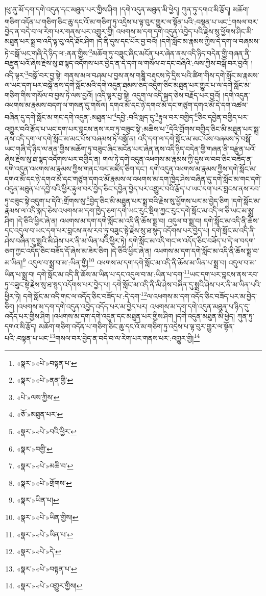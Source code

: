 །ཕུ་ནུ་མོ་དག་དགེ་འདུན་དང་མཐུན་པར་གྱིས་ཤིག །དགེ་འདུན་མཐུན་མི་ཕྱེད། ཀུན་ཏུ་དགའ་མི་རྩོད། མཆོག་གཅིག་འདོན་པ་གཅིག་ཅིང་ཆུ་དང་འོ་མ་གཅིག་ཏུ་འདྲེས་པ་ལྟ་བུར་གྱུར་ལ་སྟོན་པའི་:བསྟན་པ་ཡང་\footnote{«སྣར་»«པེ་»བསྟན་པ་}གསལ་བར་བྱེད་ན་བདེ་བ་ལ་རེག་པར་གནས་པར་འགྱུར་གྱི། འཕགས་མ་དག་དགེ་འདུན་འབྱེད་པའི་རྗེས་སུ་ཕྱོགས་ཤིང་མི་མཐུན་པར་སྨྲ་བ་འདི་ལྟ་བུ་འདི་ཐོང་ཤིག །དེ་ནི་དུས་དང་པོར་བྱ་བའོ། །དགེ་སློང་མ་རྣམས་ཀྱིས་དེ་དག་ལ་བཞམས་ཏེ་བསྒོ་ཡང་གཞི་དེ་ཉིད་ལ་:ནན་གྱིས་\footnote{«སྣར་»«པེ་»ནན་གྱི་}མཆོག་ཏུ་བཟུང་ཞིང་མངོན་པར་ཞེན་ནས་འདི་ཉིད་བདེན་གྱི་གཞན་ནི་བརྫུན་པའོ་ཞེས་རྗེས་སུ་ཐ་སྙད་འདོགས་པར་བྱེད་ན་དེ་དག་ལ་གསོལ་བ་དང་བཞིའི་:ལས་ཀྱིས་བསྒོ་བར་བྱའོ། །འདི་ལྟར་\footnote{«པེ་»ལས་ཀྱིས་}བསྒོ་བར་བྱ་སྟེ། གནས་མལ་བཤམ་པ་བྱས་ནས་གཎྜཱི་བརྡུངས་ཏེ་དྲིས་པའི་ཚིག་གིས་དགེ་སློང་མ་རྣམས་ལ་ཡང་དག་པར་བསྒོ་ནས་དགེ་སློང་མའི་དགེ་འདུན་ཐམས་ཅད་འདུག་ཅིང་མཐུན་པར་གྱུར་པ་ལ་དགེ་སློང་མ་གཅིག་གིས་གསོལ་བ་བྱས་ཏེ་ལས་བྱའོ། །འདི་ལྟར་བྱ་སྟེ། འདུག་ལ་འདི་སྐད་ཅེས་བརྗོད་པར་བྱའོ། །དགེ་འདུན་འཕགས་མ་རྣམས་བདག་ལ་གསན་དུ་གསོལ། དགའ་མོ་དང་ཉེ་དགའ་མོ་དང་གཙུག་དགའ་མོ་དེ་དག་འཚལ་བཞིན་དུ་དགེ་སློང་མ་གང་དགེ་འདུན་:མཐུན་པ་\footnote{«ཅོ་»མཐུན་པར་}དབྱེ་:བའི་སླད་དུ་\footnote{«སྣར་»«པེ་»བའི་ཕྱིར་}རྟུལ་བར་བགྱིད་\footnote{«སྣར་»བགྱི་}ཅིང་དབྱེན་བགྱིད་པར་འགྱུར་བའི་རྩོད་པ་ཡང་དག་པར་བླངས་ནས་རབ་ཏུ་བཟུང་སྟེ་:མཆིས་པ་\footnote{«སྣར་»«པེ་»མཆི་བ་}དེའི་གྲོགས་བགྱིད་ཅིང་མི་མཐུན་པར་སྨྲ་ནས་འདི་དག་ལ་དགེ་སློང་མ་མང་པོས་བཞམས་ཏེ་བསྒོ་ན། འདི་དག་ལ་དགེ་སློང་མ་མང་པོས་བཞམས་ཏེ་བསྒོ་ཡང་གཞི་དེ་ཉིད་ལ་ནན་གྱིས་མཆོག་ཏུ་བཟུང་ཞིང་མངོན་པར་ཞེན་ནས་འདི་ཉིད་བདེན་གྱི་གཞན་ནི་བརྫུན་པའོ་ཞེས་རྗེས་སུ་ཐ་སྙད་འདོགས་པར་བགྱིད་ན། གལ་ཏེ་དགེ་འདུན་འཕགས་མ་རྣམས་ཀྱི་དུས་ལ་བབ་ཅིང་བཟོད་ན་དགེ་འདུན་འཕགས་མ་རྣམས་ཀྱིས་གནང་བར་མཛོད་ཅིག་དང་། དགེ་འདུན་འཕགས་མ་རྣམས་ཀྱིས་དགེ་སློང་མ་དགའ་མོ་དང་ཉེ་དགའ་མོ་དང་གཙུག་དགའ་མོ་རྣམས་ལ་འཕགས་མ་དག་ཁྱེད་ཤེས་བཞིན་དུ་དགེ་སློང་མ་གང་དགེ་འདུན་མཐུན་པ་དབྱེ་བའི་ཕྱིར་རྟུལ་བར་བྱེད་ཅིང་དབྱེན་བྱེད་པར་འགྱུར་བའི་རྩོད་པ་ཡང་དག་པར་བླངས་ནས་རབ་ཏུ་བཟུང་སྟེ་འདུག་པ་དེའི་:གྲོགས་སུ་\footnote{«སྣར་»«པེ་»གྲོགས་}བྱེད་ཅིང་མི་མཐུན་པར་སྨྲ་བའི་རྗེས་སུ་ཕྱོགས་པར་མ་བྱེད་ཅིག །དགེ་སློང་མ་རྣམས་ལ་འདི་སྐད་ཅེས་འཕགས་མ་དག་ཁྱེད་ཅག་དགེ་ཡང་རུང་སྡིག་ཀྱང་རུང་དགེ་སློང་མ་འདི་ལ་ཅི་ཡང་མ་སྨྲ་ཤིག །དེ་ཅིའི་ཕྱིར་ཞེ་ན། འཕགས་མ་དག་དགེ་སློང་མ་འདི་ནི་ཆོས་སྨྲ་བ། འདུལ་བ་སྨྲ་བ། དགེ་སློང་མ་འདི་ནི་ཆོས་དང་འདུལ་བ་ཡང་དག་པར་བླངས་ནས་རབ་ཏུ་བཟུང་སྟེ་རྗེས་སུ་ཐ་སྙད་འདོགས་པར་བྱེད་པ། དགེ་སློང་མ་འདི་ནི་ཤེས་བཞིན་དུ་སྨྲའི་མི་ཤེས་པར་ནི་མ་ཡིན་པའི་ཕྱིར་ཏེ། དགེ་སློང་མ་འདི་གང་ལ་འདོད་ཅིང་བཟོད་པ་དེ་ལ་བདག་ཅག་ཀྱང་འདོད་ཅིང་བཟོད་དོ་ཞེས་མ་ཟེར་ཅིག །དེ་ཅིའི་ཕྱིར་ཞེ་ན། འཕགས་མ་དག་དགེ་སློང་མ་འདི་ནི་ཆོས་སྨྲ་བ་མ་ཡིན།\footnote{«སྣར་»ཡིན་པ།} འདུལ་བ་སྨྲ་བ་མ་:ཡིན་གྱི།\footnote{«སྣར་»«པེ་»ཡིན་གྱིས།} འཕགས་མ་དག་དགེ་སློང་མ་འདི་ནི་ཆོས་མ་ཡིན་པ་སྨྲ་བ། འདུལ་བ་མ་ཡིན་པ་སྨྲ་བ། དགེ་སློང་མ་འདི་ནི་ཆོས་མ་ཡིན་པ་དང་འདུལ་བ་མ་:ཡིན་པ་དག་\footnote{«སྣར་»«པེ་»ཡིན་པ་}ཡང་དག་པར་བླངས་ནས་རབ་ཏུ་བཟུང་སྟེ་རྗེས་སུ་ཐ་སྙད་འདོགས་པར་བྱེད་པ། དགེ་སློང་མ་འདི་ནི་མི་ཤེས་བཞིན་དུ་སྨྲའི་ཤེས་པར་ནི་མ་ཡིན་པའི་ཕྱིར་ཏེ། དགེ་སློང་མ་འདི་གང་ལ་འདོད་ཅིང་བཟོད་པ་:དེ་དག་\footnote{«སྣར་»«པེ་»དེ་}ལ་འཕགས་མ་དག་འདོད་ཅིང་བཟོད་པར་མ་བྱེད་ཅིག །འཕགས་མ་དག་དགེ་འདུན་འབྱེད་འདོད་པར་མ་བྱེད་པར། འཕགས་མ་དག་དགེ་འདུན་མཐུན་པ་ཉིད་དུ་འདོད་པར་གྱིས་ཤིག །འཕགས་མ་དག་དགེ་འདུན་དང་མཐུན་པར་གྱིས་ཤིག །དགེ་འདུན་མཐུན་མི་ཕྱེད། ཀུན་ཏུ་དགའ་མི་རྩོད། མཆོག་གཅིག་འདོན་པ་གཅིག་ཅིང་ཆུ་དང་འོ་མ་གཅིག་ཏུ་འདྲེས་པ་ལྟ་བུར་གྱུར་ལ་སྟོན་པའི་:བསྟན་པ་ཡང་\footnote{«སྣར་»«པེ་»བསྟན་པ་}གསལ་བར་བྱེད་ན་བདེ་བ་ལ་རེག་པར་གནས་པར་:འགྱུར་གྱི།\footnote{«སྣར་»«པེ་»འགྱུར་གྱིས།} 